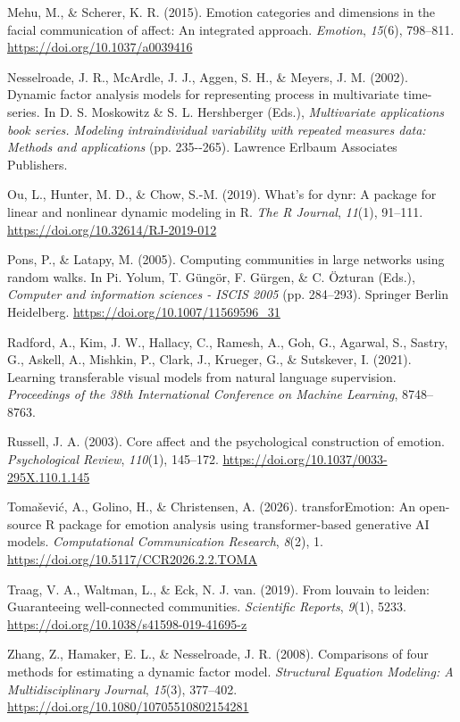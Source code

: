 \documentclass[
]{article}
\newlength{\cslhangindent}
\newenvironment{CSLReferences}[2] %
 {\begin{list}{}{%
  \setlength{\itemindent}{0pt}
  \setlength{\leftmargin}{0pt}
  \setlength{\parsep}{0pt}
  \ifodd #1
   \setlength{\leftmargin}{\cslhangindent}
   \setlength{\itemindent}{-1\cslhangindent}
  \fi
  \setlength{\itemsep}{#2\baselineskip}}}
 {\end{list}}
\begin{document}
\begin{CSLReferences}{1}{0}
Mehu, M., \& Scherer, K. R. (2015). Emotion categories and dimensions in
the facial communication of affect: {An} integrated approach.
\emph{Emotion}, \emph{15}(6), 798--811.
\url{https://doi.org/10.1037/a0039416}

Nesselroade, J. R., McArdle, J. J., Aggen, S. H., \& Meyers, J. M.
(2002). Dynamic factor analysis models for representing process in
multivariate time-series. In D. S. Moskowitz \& S. L. Hershberger
(Eds.), \emph{Multivariate applications book series. Modeling
intraindividual variability with repeated measures data: Methods and
applications} (pp. 235-\/-265). Lawrence Erlbaum Associates Publishers.

Ou, L., Hunter, M. D., \& Chow, S.-M. (2019). What's for {dynr}: A
package for linear and nonlinear dynamic modeling in {R}. \emph{The R
Journal}, \emph{11}(1), 91--111.
\url{https://doi.org/10.32614/RJ-2019-012}

Pons, P., \& Latapy, M. (2005). Computing communities in large networks
using random walks. In Pi. Yolum, T. Güngör, F. Gürgen, \& C. Özturan
(Eds.), \emph{Computer and information sciences - ISCIS 2005} (pp.
284--293). Springer Berlin Heidelberg.
\url{https://doi.org/10.1007/11569596_31}

Radford, A., Kim, J. W., Hallacy, C., Ramesh, A., Goh, G., Agarwal, S.,
Sastry, G., Askell, A., Mishkin, P., Clark, J., Krueger, G., \&
Sutskever, I. (2021). Learning transferable visual models from natural
language supervision. \emph{Proceedings of the 38th International
Conference on Machine Learning}, 8748--8763.

Russell, J. A. (2003). Core affect and the psychological construction of
emotion. \emph{Psychological Review}, \emph{110}(1), 145--172.
\url{https://doi.org/10.1037/0033-295X.110.1.145}

Tomašević, A., Golino, H., \& Christensen, A. (2026). {transforEmotion}:
An open-source {R} package for emotion analysis using transformer-based
generative {AI} models. \emph{Computational Communication Research},
\emph{8}(2), 1. \url{https://doi.org/10.5117/CCR2026.2.2.TOMA}

Traag, V. A., Waltman, L., \& Eck, N. J. van. (2019). From louvain to
leiden: Guaranteeing well-connected communities. \emph{Scientific
Reports}, \emph{9}(1), 5233.
\url{https://doi.org/10.1038/s41598-019-41695-z}

Zhang, Z., Hamaker, E. L., \& Nesselroade, J. R. (2008). Comparisons of
four methods for estimating a dynamic factor model. \emph{Structural
Equation Modeling: A Multidisciplinary Journal}, \emph{15}(3), 377--402.
\url{https://doi.org/10.1080/10705510802154281}

\end{CSLReferences}
\end{document}
